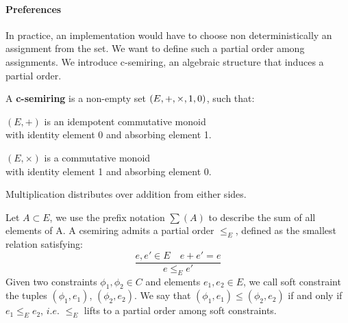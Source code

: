 
\paragraph{Preferences} 
In practice, an implementation would have to choose non deterministically an assignment from the set. We want to define such a partial order among assignments. We introduce c-semiring, an algebraic structure that induces a partial order.


\begin{definition} A \textbf{c-semiring} is a non-empty set $(E, +, \times, \boldmath{1},\boldmath{0} )$, such that:
	\begin{list}{-}{ }
		\item $(E,+)$ is an idempotent commutative monoid \\ 
			\text{ \quad \quad \quad \quad \quad} with identity element 0 and absorbing element 1. 
		\item $(E,\times)$ is a commutative monoid \\
			\text{ \quad \quad \quad \quad \quad} with identity element 1 and absorbing element 0.
		\item Multiplication distributes over addition from either sides.
	\end{list} 
\end{definition}
Let $A \subset E$, we use the prefix notation $\sum(A)$ to describe the sum of all elements of A.
A csemiring admits a partial order $\leq_{E}$, defined as the smallest relation satisfying:
$$ \frac{e,e' \in E \quad e+e' = e}{e \leq_{E} e'} $$
Given two constraints $\phi_1,\phi_2 \in C$ and elements $e_1,e_2 \in E$, we call soft constraint the tuples $(\phi_1,e_1)$, $(\phi_2,e_2)$. We say that $(\phi_1,e_1)\leq(\phi_2,e_2)$ if and only if $e_1 \leq_E e_2$, $i.e.$ $\leq_E$ lifts to a partial order among soft constraints. 

